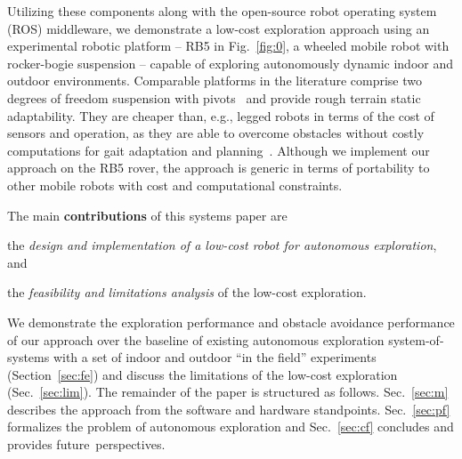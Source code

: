 \documentclass[letterpaper,10pt,conference,twoside]{IEEEtran}
\theoremstyle{definition}
\begin{document}
Utilizing these components along with the open-source robot operating system (ROS) middleware, we %
demonstrate a low-cost %
exploration approach %
using an experimental robotic platform -- RB5 in Fig.~\ref{fig:0}, a wheeled mobile robot with rocker-bogie suspension -- capable of exploring autonomously dynamic indoor and outdoor environments.
Comparable platforms in the literature comprise two degrees of freedom suspension with pivots~\cite{setterfield2013terrain,%
faisal2021low} and provide rough terrain static adaptability. %
They are cheaper than, e.g., legged robots in terms of the cost of sensors %
and operation, as they are able to overcome obstacles without costly computations for gait adaptation and planning~\cite{muller2021openbot}.
Although %
we implement our approach on the RB5 rover, %
the approach is generic in terms of portability to other mobile robots with cost and computational constraints.

The main \textbf{contributions} of this systems paper are 
\begin{enumerate*}[label={(\roman*)},font={\textit}]
  \item the \textit{design and implementation of a low-cost robot for autonomous exploration}, and 
  \item the \textit{feasibility and limitations analysis} of the low-cost exploration. 
\end{enumerate*}
We demonstrate the exploration performance and obstacle avoidance performance of our approach over the baseline of existing autonomous exploration system-of-systems with a set of indoor and outdoor “in the field” experiments (Section~\ref{sec:fe}) and discuss the limitations of the low-cost exploration (Sec.~\ref{sec:lim}). The remainder of the paper is structured as follows. Sec.~\ref{sec:m} describes the approach from the software and hardware standpoints. Sec.~\ref{sec:pf} formalizes the problem of autonomous exploration and Sec.~\ref{sec:cf} concludes and provides future~perspectives.


\end{document}
